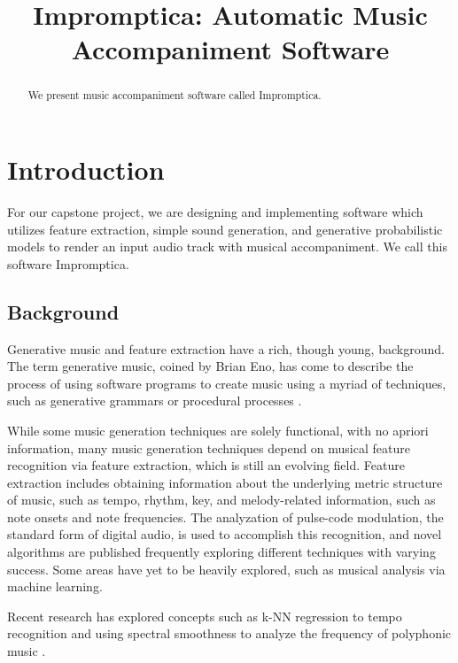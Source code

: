 \documentclass[11pt,conference,letterpaper]{IEEEtran}
\begin{document}
\title{Impromptica: Automatic Music Accompaniment Software}
\author{}

\maketitle

\begin{abstract}
We present music accompaniment software called Impromptica.
\end{abstract}

\section{Introduction}
For our capstone project, we are designing and implementing software which utilizes feature extraction, simple sound generation, and generative probabilistic models to render an input audio track with musical accompaniment. We call this software Impromptica.

\subsection{Background} 
Generative music and feature extraction have a rich, though young, background. The term generative music, coined by Brian Eno, has come to describe the process of using software programs to create music using a myriad of techniques, such as generative grammars or procedural processes \cite{wooller2005framework}. 

While some music generation techniques are solely functional, with no apriori information, many music generation techniques depend on musical feature recognition via feature extraction, which is still an evolving field. Feature extraction includes obtaining information about the underlying metric structure of music, such as tempo, rhythm, key, and melody-related information, such as note onsets and note frequencies. The analyzation of pulse-code modulation, the standard form of digital audio, is used to accomplish this recognition, and novel algorithms are published frequently exploring different techniques with varying success. Some areas have yet to be heavily explored, such as musical analysis via machine learning.

Recent research has explored concepts such as k-NN regression to tempo recognition \cite{eronen2010music} and using spectral smoothness to analyze the frequency of polyphonic music \cite{klapuri2003multiple}.
\end{document}
